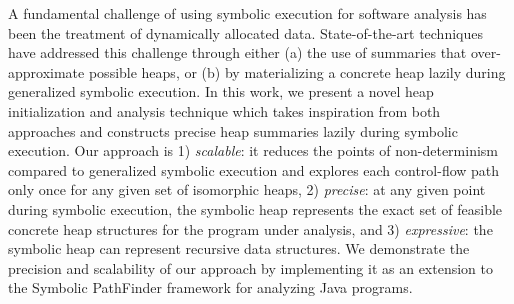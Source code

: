 A fundamental challenge of using symbolic execution for software
analysis has been the treatment of dynamically allocated data.
State-of-the-art techniques have addressed this challenge through
either (a) the use of summaries that over-approximate possible heaps, or
(b) by materializing a concrete heap lazily during generalized
symbolic execution. In this work, we present a novel heap
initialization and analysis technique which takes inspiration from
both approaches and constructs precise heap summaries lazily during
symbolic execution.  Our approach is 1) \emph{scalable}: it reduces the
points of non-determinism compared to generalized symbolic execution
and explores each control-flow path only once for any given set of
isomorphic heaps, 2) \emph{precise}: at any given point during symbolic
execution, the symbolic heap represents the exact set of feasible
concrete heap structures for the program under analysis, and 3)
\emph{expressive}: the symbolic heap can represent recursive data
structures. We demonstrate the precision and scalability of our
approach by implementing it as an extension to the Symbolic PathFinder
framework for analyzing Java programs.


